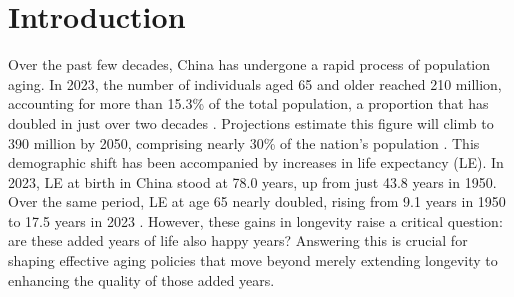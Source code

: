 \documentclass[12pt, a4paper]{article}
\begin{document}

\newpage
\section{Introduction}
Over the past few decades, China has undergone a rapid process of population aging. In 2023, the number of individuals aged 65 and older reached 210 million, accounting for more than 15.3\% of the total population, a proportion that has doubled in just over two decades \autocite{nationalbureauofstatisticsofchina.2023.china}. Projections estimate this figure will climb to 390 million by 2050, comprising nearly 30\% of the nation's population \autocite{unitednations.2024.world}.  This demographic shift has been accompanied by increases in life expectancy (LE). In 2023, LE at birth in China stood at 78.0 years, up from just 43.8 years in 1950. Over the same period, LE at age 65 nearly doubled, rising from 9.1 years in 1950 to 17.5 years in 2023 \autocite{unitednations.2024.world}. However, these gains in longevity raise a critical question: are these added years of life also happy years? Answering this is crucial for shaping effective aging policies that move beyond merely extending longevity to enhancing the quality of those added years.
\end{document}
